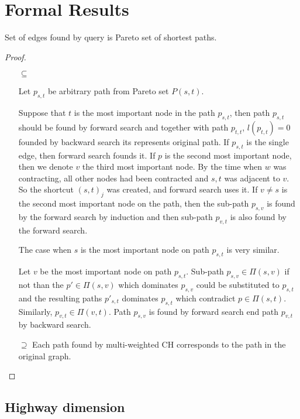

\section{Formal Results}
\label{secFormalResults}

\begin{lemma}
Set of edges found by query is Pareto set of shortest paths.
\end{lemma}
\begin{proof}
\begin{itemize}
\item[$\subseteq$] 

Let $p_{s,t}$ be arbitrary path from Pareto set $P(s,t)$. 

Suppose that $t$ is the most important node in the path $p_{s,t}$, 
then path $p_{s,t}$ should be found by forward search
and together with path $p_{t,t}$, $l(p_{t,t})=0$ 
founded by backward search its represents original path.
If $p_{s,t}$ is the single edge, then forward search founds it.
If $p$ is the second most important node, then we denote $v$ the
third most important node. 
By the time when $w$ was contracting, all other nodes had been contracted
and $s,t$ was adjacent to $v$. So the shortcut $(s,t)_j$ was created, and forward search uses it.
If $v \ne s$ is the second most important node on the path,
then the sub-path $p_{s,v}$ is found by the forward search by induction and
then sub-path $p_{v,t}$ is also found by the forward search.

The case when $s$ is the most important node on path $p_{s,t}$ is very similar. 

Let $v$ be the most important node on path $p_{s,t}$. 
Sub-path $p_{s,v} \in \Pi(s,v)$ 
if not than the $p' \in \Pi(s,v)$ which dominates $p_{s,v}$ could be substituted
to $p_{s,t}$ and the resulting paths $p'_{s,t}$ dominates $p_{s,t}$ which contradict
$p \in \Pi(s,t)$.
Similarly, $p_{v,t} \in \Pi(v,t) $. Path $p_{s,v}$ is found by forward search end path
$p_{v,t}$ by backward search.

\item[$\supseteq$] 
Each path found by multi-weighted CH corresponds to the path in the original graph. 

\end{itemize}
\end{proof}

\subsection{Highway dimension}

